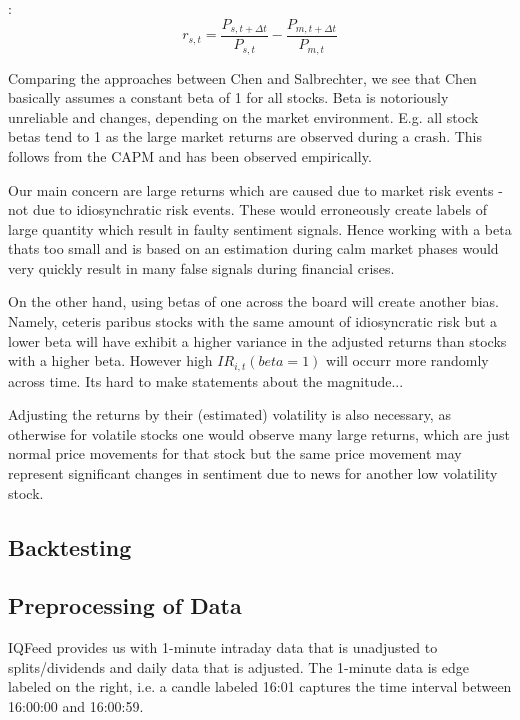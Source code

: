 \documentclass[12pt,a4paper]{article}
\begin{document}
	\cite{chen_stock_2021}:
	$$
	r_{s, t}=\frac{P_{s, t+\Delta t}}{P_{s, t}}-\frac{P_{m, t+\Delta t}}{P_{m, t}}
	$$
	
	Comparing the approaches between Chen and Salbrechter, we see that Chen basically assumes a constant beta of 1 for all stocks. 
	Beta is notoriously unreliable and changes, depending on the market environment.
	E.g. all stock betas tend to 1 as the large market returns are observed during a crash.
	This follows from the CAPM and has been observed empirically.
	
	Our main concern are large returns which are caused due to market risk events - not due to idiosynchratic risk events.
	These would erroneously create labels of large quantity which result in faulty sentiment signals.
	Hence working with a beta thats too small and is based on an estimation during calm market phases would very quickly result in many false signals during financial crises.
	
	On the other hand, using betas of one across the board will create another bias.
	Namely, ceteris paribus stocks with the same amount of idiosyncratic risk but a lower beta will have exhibit a higher variance in the adjusted returns than stocks with a higher beta.
	However high $IR_{i,t}(beta=1)$ will occurr more randomly across time.
	Its hard to make statements about the magnitude...
	
	Adjusting the returns by their (estimated) volatility is also necessary, as otherwise for volatile stocks
	one would observe many large returns, which are just normal price movements for that stock but the same price movement may represent significant changes in sentiment due to news for another low volatility stock.
	
	
	
	\subsection{Backtesting}
	
	\subsection{Preprocessing of Data}
	IQFeed provides us with 1-minute intraday data that is unadjusted to splits/dividends and daily data that is adjusted. 
	The 1-minute data is edge labeled on the right, i.e. a candle labeled 16:01 captures the time interval
	between 16:00:00 and 16:00:59.
	
\end{document}
